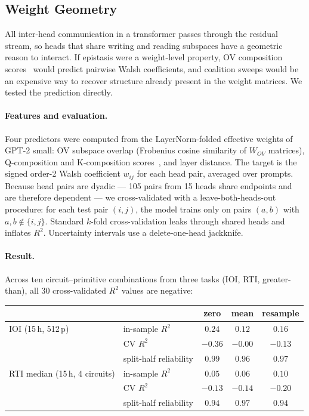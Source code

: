 \documentclass{article}
\begin{document}
\subsection{Weight Geometry}
\label{sec:weight-geometry}

All inter-head communication in a transformer passes through the residual
stream, so heads that share writing and reading subspaces have a geometric
reason to interact. If epistasis were a weight-level property, OV composition
scores~\citep{elhage2021mathematical} would predict pairwise Walsh
coefficients, and coalition sweeps would be an expensive way to recover
structure already present in the weight matrices. We tested the prediction directly.

\paragraph{Features and evaluation.}

Four predictors were computed from the LayerNorm-folded effective
weights of GPT-2 small: OV subspace overlap (Frobenius cosine similarity
of $W_{OV}$ matrices), Q-composition and K-composition
scores~\citep{elhage2021mathematical}, and layer distance. The target is
the signed order-2 Walsh coefficient $w_{ij}$ for each head pair, averaged
over prompts. Because head pairs are dyadic --- 105 pairs from 15 heads
share endpoints and are therefore dependent --- we cross-validated with a
leave-both-heads-out procedure: for each test pair $(i,j)$, the model
trains only on pairs $(a,b)$ with $a,b \notin \{i,j\}$. Standard
$k$-fold cross-validation leaks through shared heads and inflates
$R^2$. Uncertainty intervals use a delete-one-head jackknife.

\paragraph{Result.}

Across ten circuit--primitive combinations from three tasks (IOI, RTI,
greater-than), all 30 cross-validated $R^2$ values are negative:

\medskip

\begin{tabular}{llccc}
\toprule
 & & zero & mean & resample \\
\midrule
IOI (15\,h, 512\,p)
 & in-sample $R^2$ & $0.24$ & $0.12$ & $0.16$ \\
 & CV $R^2$ & $-0.36$ & $-0.00$ & $-0.13$ \\
 & split-half reliability & $0.99$ & $0.96$ & $0.97$ \\
\midrule
RTI median (15\,h, 4 circuits)
 & in-sample $R^2$ & $0.05$ & $0.06$ & $0.10$ \\
 & CV $R^2$ & $-0.13$ & $-0.14$ & $-0.20$ \\
 & split-half reliability & $0.94$ & $0.97$ & $0.94$ \\
\bottomrule
\end{tabular}
\end{document}
